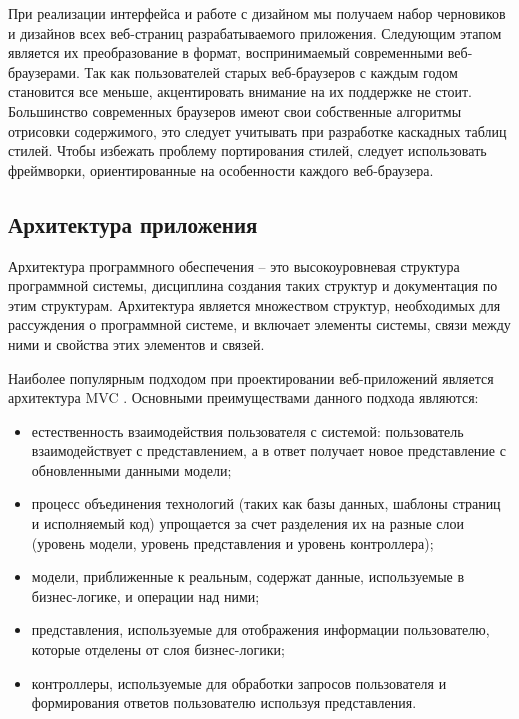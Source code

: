 При реализации интерфейса и работе с дизайном мы получаем набор черновиков и дизайнов всех веб-страниц разрабатываемого приложения. Следующим этапом является их преобразование в формат, воспринимаемый современными веб-браузерами. Так как пользователей старых веб-браузеров с каждым годом становится все меньше, акцентировать внимание на их поддержке не стоит. Большинство современных браузеров имеют свои собственные алгоритмы отрисовки содержимого, это следует учитывать при разработке каскадных таблиц стилей. Чтобы избежать проблему портирования стилей, следует использовать фреймворки, ориентированные на особенности каждого веб-браузера.


\subsection{Архитектура приложения}
\label{sub:domain:manual_structure}
Архитектура программного обеспечения -- это высокоуровневая структура программной системы, дисциплина создания таких структур и документация по этим структурам. Архитектура является множеством структур, необходимых для рассуждения о программной системе, и включает элементы системы, связи между ними и свойства этих элементов и связей.

Наиболее популярным подходом при проектировании веб-приложений является архитектура MVC \cite{mvc}. Основными преимуществами данного подхода являются:

\begin{itemize}
  \item естественность взаимодействия пользователя с системой: пользователь взаимодействует с представлением, а в ответ получает новое представление с обновленными данными модели;
  \item процесс объединения технологий (таких как базы данных, шаблоны страниц и исполняемый код) упрощается за счет разделения их на разные слои (уровень модели, уровень представления и уровень контроллера);
  \item модели, приближенные к реальным, содержат данные, используемые в бизнес-логике, и операции над ними;
  \item представления, используемые для отображения информации пользователю, которые отделены от слоя бизнес-логики;
  \item контроллеры, используемые для обработки запросов пользователя и формирования ответов пользователю используя представления.
\end{itemize}

